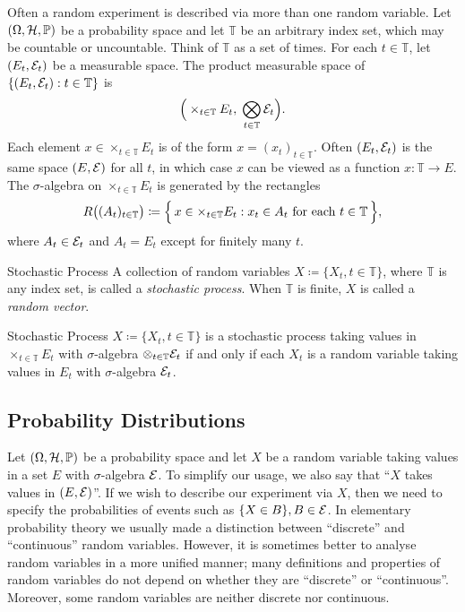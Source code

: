 Often a random experiment is described via more than one random variable. Let \((\Omega,\mathcal{H},\mathbb{P})\) be a probability space and let \(\mathbb{T}\) be an arbitrary index set, which may be countable or uncountable. Think of \(\mathbb{T}\) as a set of times. For each \(t \in \mathbb{T}\), let \((E_t,\mathcal{E}_t)\) be a measurable space. The product measurable space of \(\{(E_t,\mathcal{E}_t): t \in \mathbb{T}\}\) is
\[
	\Big(\times_{t \in \mathbb{T}} E_t,\;\bigotimes_{t \in \mathbb{T}} \mathcal{E}_t\Big).
\]
Each element \(x \in \times_{t \in \mathbb{T}} E_t\) is of the form \(x = (x_t)_{t \in \mathbb{T}}\). Often \((E_t,\mathcal{E}_t)\) is the same space \((E,\mathcal{E})\) for all \(t\), in which case \(x\) can be viewed as a function \(x:\mathbb{T} \to E\). The \(\sigma\)-algebra on \(\times_{t \in \mathbb{T}} E_t\) is generated by the rectangles
\begin{equation}
	R\bigl((A_t)_{t \in \mathbb{T}}\bigr) \coloneqq \Bigl\{\,x \in \times_{t \in \mathbb{T}} E_t : x_t \in A_t \text{ for each } t \in \mathbb{T}\,\Bigr\},
	\label{eq:ProductRectangles}
\end{equation}
where \(A_t \in \mathcal{E}_t\) and \(A_t = E_t\) except for finitely many \(t\).

\begin{defn}{Stochastic Process}{}
	A collection of random variables \(X \coloneqq \{X_t, t \in \mathbb{T}\}\), where \(\mathbb{T}\) is any index set, is called a \textit{stochastic process}. When \(\mathbb{T}\) is finite, \(X\) is called a \textit{random vector}.
\end{defn}

\begin{thm}{Stochastic Process}{}
	\(X \coloneqq \{X_t, t \in \mathbb{T}\}\) is a stochastic process taking values in \(\times_{t \in \mathbb{T}} E_t\) with \(\sigma\)-algebra \(\otimes_{t \in \mathbb{T}} \mathcal{E}_t\) if and only if each \(X_t\) is a random variable taking values in \(E_t\) with \(\sigma\)-algebra \(\mathcal{E}_t\).
\end{thm}

\subsection{Probability Distributions}
Let \((\Omega, \mathcal{H}, \mathbb{P})\) be a probability space and let \(X\) be a random variable taking values
in a set \(E\) with \(\sigma\)-algebra \(\mathcal{E}\). To simplify our usage, we also say that ``\(X\) takes values
in \((E, \mathcal{E})\)''. If we wish to describe our experiment via \(X\), then we need to specify
the probabilities of events such as \(\{X \in B\}, B \in \mathcal{E}\). In elementary probability
theory we usually made a distinction between ``discrete'' and ``continuous'' random
variables. However, it is sometimes better to analyse random variables in a more
unified manner; many definitions and properties of random variables do not depend
on whether they are ``discrete'' or ``continuous''. Moreover, some random variables
are neither discrete nor continuous.

